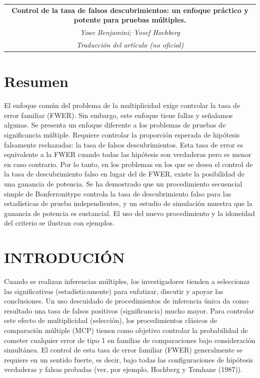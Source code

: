 \documentclass[11pt,letterpaper]{article}
\begin{document}
\begin{table}[ht]
\centering
\begin{tabular}{c}
\textbf{Control de la tasa de falsos descubrimientos: un enfoque práctico y potente para pruebas múltiples.}\\
\emph{Yoav Benjamini; Yosef Hochberg}\\
\emph{Traducción del artículo (\textit{no oficial})}
\end{tabular}
\end{table}

\section*{Resumen}
El enfoque común del problema de la multiplicidad exige controlar la tasa de error familiar (FWER). Sin embargo, este enfoque tiene fallas y señalamos algunas. Se presenta un enfoque diferente a los problemas de pruebas de significancia múltiple. Requiere controlar la proporción esperada de hipótesis falsamente rechazadas: la tasa de falsos descubrimientos. Esta tasa de error es equivalente a la FWER cuando todas las hipótesis son verdaderas pero es menor en caso contrario. Por lo tanto, en los problemas en los que se desea el control de la tasa de descubrimiento falso en lugar del de FWER, existe la posibilidad de una ganancia de potencia. Se ha demostrado que un procedimiento secuencial simple de Bonferronitype controla la tasa de descubrimiento falso para las estadísticas de prueba independientes, y un estudio de simulación muestra que la ganancia de potencia es sustancial. El uso del nuevo procedimiento y la idoneidad del criterio se ilustran con ejemplos.

\section{INTRODUCIÓN}
Cuando se realizan inferencias múltiples, los investigadores tienden a seleccionar las significativas (estadísticamente) para enfatizar, discutir y apoyar las conclusiones. Un uso descuidado de procedimientos de inferencia única da como resultado una tasa de falsos positivos (significancia) mucho mayor. Para controlar este efecto de multiplicidad (selección), los procedimientos clásicos de comparación múltiple (MCP) tienen como objetivo controlar la probabilidad de cometer cualquier error de tipo 1 en familias de comparaciones bajo consideración simultánea. El control de esta tasa de error familiar (FWER) generalmente se requiere en un sentido fuerte, es decir, bajo todas las configuraciones de hipótesis verdaderas y falsas probadas (ver, por ejemplo, Hochberg y Temhane (1987)).\\
\end{document}
